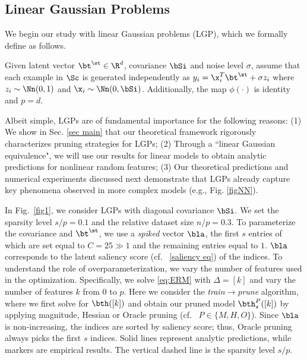 \subsection{Linear Gaussian Problems} 
We begin our study with linear Gaussian problems (LGP), which we formally define as follows. 
\begin{definition} \label{def LGP}Given latent vector $\bt^\st\in\R^d$, covariance $\bSi$ and noise level $\sigma$, assume that each example in $\Sc$ is generated independently as $y_i=\x_i^T\bt^\st+ \sigma z_i$ where $z_i\sim\Nn(0,1)$ and $\x_i\sim\Nn(0,\bSi)$. Additionally, the map $\phi(\cdot)$ is identity and $p=d$.
\end{definition}
Albeit simple, LGPs are of fundamental importance for the following reasons: (1) We show in Sec. \ref{sec main} that our theoretical framework rigorously characterizes pruning strategies for LGPs; (2) Through a ``linear Gaussian equivalence", we will use our results for linear models to obtain analytic predictions for nonlinear random features; (3) Our theoretical predictions and numerical experiments discussed next demonstrate that LGPs already capture key phenomena observed in more complex models (e.g., Fig. \ref{figNN}).

In Fig.~\ref{fig1}, we consider LGPs with diagonal covariance $\bSi$. We set  the sparsity  level $s/p=0.1$ and the relative dataset size $n/p=0.3$. To parameterize the covariance and $\bt^\st$, we use a {\em{spiked}} vector $\bla$, the first $s$ entries of which are set equal to $C=25\gg 1$ and the remaining entries equal to $1$. $\bla$ corresponds to the latent saliency score (cf. ~\eqref{saliency eq}) of the indices. To understand the role of overparameterization, we vary the number of features used in the optimization. Specifically, we solve \eqref{eq:ERM} with $\Delta=[k]$ and vary the number of features $k$ from $0$ to $p$. Here we consider the {\em{train$\rightarrow$prune}} algorithm, where we first solve for $\bth([k])$ and obtain our pruned model $\bth^P_s([k])$ by applying magnitude, Hessian or Oracle pruning (cf. ~$P\in \{M,H,O\}$). Since $\bla$ is non-increasing, the indices are sorted by saliency score; thus, Oracle pruning always picks the first $s$ indices. Solid lines represent analytic predictions, while markers are empirical results.
 The vertical dashed line is the sparsity level $s/p$. 

